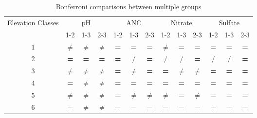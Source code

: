 \begin{table}[htbp]
\caption{Bonferroni comparisons between multiple groups}
\begin{center}
\begin{tabular}{p{2cm}cccccccccccc}
\toprule
 Elevation Classes& \multicolumn{ 3}{c}{pH} & \multicolumn{ 3}{c}{ANC} & \multicolumn{ 3}{c}{Nitrate} & \multicolumn{ 3}{c}{Sulfate} \\ \cline{2-13}\noalign{\smallskip}
 & \multicolumn{ 1}{c}{1-2} & 1-3 & 2-3 & 1-2 & 1-3 & 2-3 & 1-2 & 1-3 & 2-3 & 1-2 & 1-3 & 2-3 \\  \cline{2-13}
\multicolumn{1}{c}{1} & \textbf{$\neq$} & \textbf{$\neq$} & \textbf{$\neq$} & \textbf{=} & \textbf{=} & \textbf{=} & \textbf{$\neq$} & \textbf{=} & \textbf{=} & \textbf{=} & \textbf{=} & \textbf{=} \\ 
\multicolumn{1}{c}{2} & \textbf{=} & \textbf{=} & \textbf{=} & \textbf{=} & \textbf{$\neq$} & \textbf{=} & \textbf{$\neq$} & \textbf{$\neq$} & \textbf{=} & \textbf{$\neq$} & \textbf{$\neq$} & \textbf{=} \\ 
\multicolumn{1}{c}{3} & \textbf{$\neq$} & \textbf{$\neq$} & \textbf{$\neq$} & \textbf{=} & \textbf{$\neq$} & \textbf{=} & \textbf{=} & \textbf{$\neq$} & \textbf{$\neq$} & \textbf{=} & \textbf{=} & \textbf{=} \\ 
\multicolumn{1}{c}{4} & \textbf{=} & \textbf{$\neq$} & \textbf{$\neq$} & \textbf{=} & \textbf{=} & \textbf{=} & \textbf{=} & \textbf{=} & \textbf{=} & \textbf{=} & \textbf{=} & \textbf{=} \\ 
\multicolumn{1}{c}{5} & \textbf{$\neq$} & \textbf{$\neq$} & \textbf{$\neq$} & \textbf{=} & \textbf{$\neq$} & \textbf{$\neq$} & \textbf{$\neq$} & \textbf{=} & \textbf{$\neq$} & \textbf{=} & \textbf{=} & \textbf{=} \\ 
\multicolumn{1}{c}{6} & \textbf{=} & \textbf{$\neq$} & \textbf{$\neq$} & \textbf{=} & \textbf{=} & \textbf{=} & \textbf{=} & \textbf{=} & \textbf{=} & \textbf{=} & \textbf{=} & \textbf{=} \\ 
\bottomrule
\end{tabular}
\end{center}
\label{tab:Bontable}
\end{table}